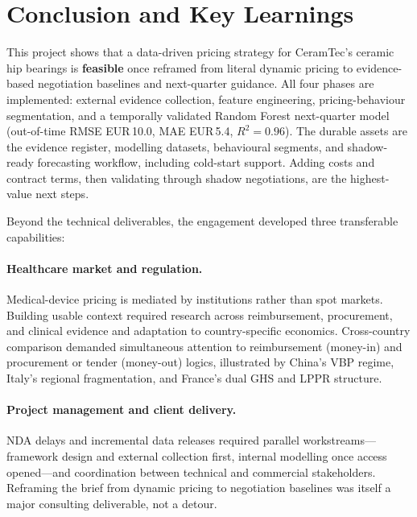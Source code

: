 \documentclass{article}
\begin{document}
\clearpage

\section{Conclusion and Key Learnings}


This project shows that a data-driven pricing strategy for CeramTec's ceramic hip bearings is \textbf{feasible} once reframed from literal dynamic pricing to evidence-based negotiation baselines and next-quarter guidance. All four phases are implemented: external evidence collection, feature engineering, pricing-behaviour segmentation, and a temporally validated Random Forest next-quarter model (out-of-time RMSE EUR\,10.0, MAE EUR\,5.4, $R^2{=}0.96$). The durable assets are the evidence register, modelling datasets, behavioural segments, and shadow-ready forecasting workflow, including cold-start support. Adding costs and contract terms, then validating through shadow negotiations, are the highest-value next steps.

Beyond the technical deliverables, the engagement developed three transferable capabilities:

\vspace{0.4em}

\paragraph{Healthcare market and regulation.}
Medical-device pricing is mediated by institutions rather than spot markets. Building usable context required research across reimbursement, procurement, and clinical evidence and adaptation to country-specific economics. Cross-country comparison demanded simultaneous attention to reimbursement (money-in) and procurement or tender (money-out) logics, illustrated by China's VBP regime, Italy's regional fragmentation, and France's dual GHS and LPPR structure.

\vspace{0.4em}

\paragraph{Project management and client delivery.}
NDA delays and incremental data releases required parallel workstreams---framework design and external collection first, internal modelling once access opened---and coordination between technical and commercial stakeholders. Reframing the brief from dynamic pricing to negotiation baselines was itself a major consulting deliverable, not a detour.
\end{document}

